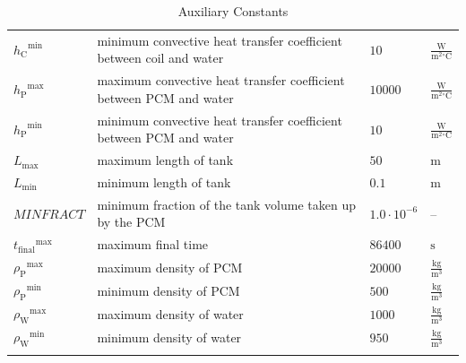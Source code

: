 \documentclass[12pt]{article}
\begin{document}
\begin{longtabu}{l X[l] l l}
\\
${{h_{\text{C}}}^{\text{min}}}$ & minimum convective heat transfer coefficient between coil and water & $10$ & $\frac{\text{W}}{\text{m}^{2}{}^{\circ}\text{C}}$
\\
${{h_{\text{P}}}^{\text{max}}}$ & maximum convective heat transfer coefficient between PCM and water & $10000$ & $\frac{\text{W}}{\text{m}^{2}{}^{\circ}\text{C}}$
\\
${{h_{\text{P}}}^{\text{min}}}$ & minimum convective heat transfer coefficient between PCM and water & $10$ & $\frac{\text{W}}{\text{m}^{2}{}^{\circ}\text{C}}$
\\
${L_{\text{max}}}$ & maximum length of tank & $50$ & ${\text{m}}$
\\
${L_{\text{min}}}$ & minimum length of tank & $0.1$ & ${\text{m}}$
\\
$MINFRACT$ & minimum fraction of the tank volume taken up by the PCM & $1.0\cdot{}10^{-6}$ & --
\\
${{t_{\text{final}}}^{\text{max}}}$ & maximum final time & $86400$ & ${\text{s}}$
\\
${{ρ_{\text{P}}}^{\text{max}}}$ & maximum density of PCM & $20000$ & $\frac{\text{kg}}{\text{m}^{3}}$
\\
${{ρ_{\text{P}}}^{\text{min}}}$ & minimum density of PCM & $500$ & $\frac{\text{kg}}{\text{m}^{3}}$
\\
${{ρ_{\text{W}}}^{\text{max}}}$ & maximum density of water & $1000$ & $\frac{\text{kg}}{\text{m}^{3}}$
\\
${{ρ_{\text{W}}}^{\text{min}}}$ & minimum density of water & $950$ & $\frac{\text{kg}}{\text{m}^{3}}$
\\
\bottomrule
\caption{Auxiliary Constants}
\label{Table:TAuxConsts}
\end{longtabu}
\end{document}
